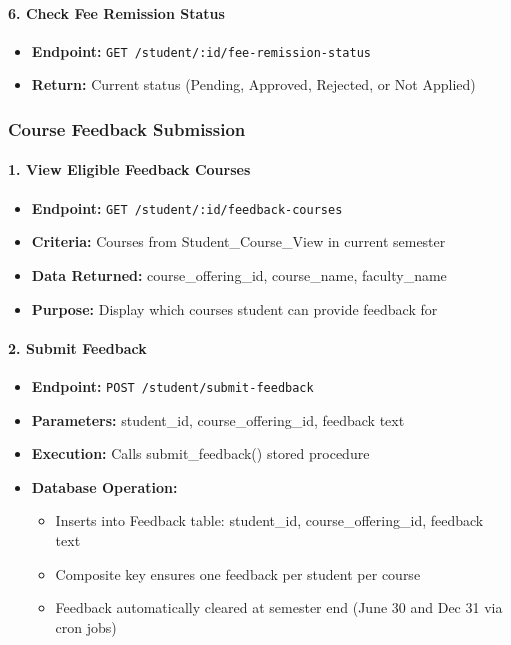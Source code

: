 \documentclass[12pt]{article}
\begin{document}
\paragraph{6. Check Fee Remission Status}
\begin{itemize}
    \item \textbf{Endpoint:} \texttt{GET /student/:id/fee-remission-status}
    \item \textbf{Return:} Current status (Pending, Approved, Rejected, or Not Applied)
\end{itemize}

\subsubsection{Course Feedback Submission}

\paragraph{1. View Eligible Feedback Courses}
\begin{itemize}
    \item \textbf{Endpoint:} \texttt{GET /student/:id/feedback-courses}
    \item \textbf{Criteria:} Courses from Student\_Course\_View in current semester
    \item \textbf{Data Returned:} course\_offering\_id, course\_name, faculty\_name
    \item \textbf{Purpose:} Display which courses student can provide feedback for
\end{itemize}

\paragraph{2. Submit Feedback}
\begin{itemize}
    \item \textbf{Endpoint:} \texttt{POST /student/submit-feedback}
    \item \textbf{Parameters:} student\_id, course\_offering\_id, feedback text
    \item \textbf{Execution:} Calls submit\_feedback() stored procedure
    \item \textbf{Database Operation:}
        \begin{itemize}
            \item Inserts into Feedback table: student\_id, course\_offering\_id, feedback text
            \item Composite key ensures one feedback per student per course
            \item Feedback automatically cleared at semester end (June 30 and Dec 31 via cron jobs)
        \end{itemize}
\end{itemize}
\end{document}
